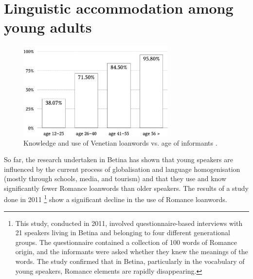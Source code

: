 \documentclass[output=paper]{LSP/langsci}
\begin{document}
\section{Linguistic accommodation among young adults}
\begin{figure}[b]
\includegraphics[width=0.7\textwidth]{illustrations/skevin_fig1.pdf}
\caption{Knowledge and use of Venetian loanwords vs. age of informants \citep[175]{skevin_izmedu_2012}.}
\label{fig:1}
\end{figure}
So far, the research undertaken in Betina has shown that young speakers are influenced by the current process of globalisation and language homogenisation (mostly through schools, media, and tourism) and that they use and know significantly fewer Romance loanwords than older speakers. The results of a study done in 2011 \citep{skevin_izmedu_2012}\footnote{This study, conducted in 2011, involved questionnaire-based interviews with 21 speakers living in Betina and belonging to four different generational groups. The questionnaire contained a collection of 100 words of Romance origin, and the informants were asked whether they knew the meanings of the words. The study confirmed that in Betina, particularly in the vocabulary of young speakers, Romance elements are rapidly disappearing.} show a significant decline in the use of Romance loanwords. 
  
\end{document}
